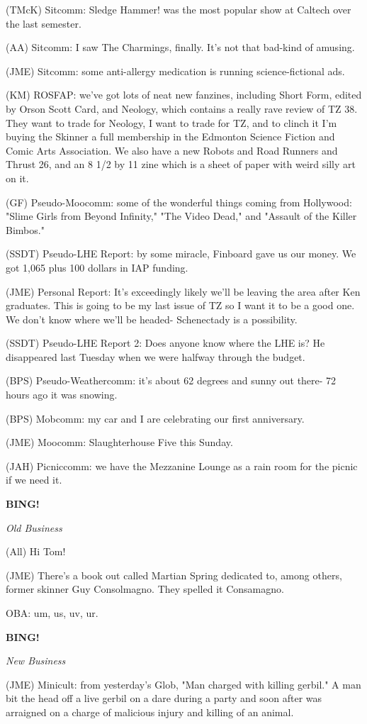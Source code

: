 \documentclass[12pt]{article}
\newcommand{\bing}{{\bf BING!} }
\newcommand{\goto}[1]{\bing \vskip 12pt \centerline{{\em{#1}}}}
\begin{document}
(TMcK) Sitcomm: Sledge Hammer! was the most popular show at Caltech over the last semester.

(AA) Sitcomm: I saw The Charmings, finally. It's not that bad-kind of amusing.

(JME) Sitcomm: some anti-allergy medication is running science-fictional ads.

(KM) ROSFAP: we've got lots of neat new fanzines, including Short Form, edited by Orson Scott Card, and Neology, which contains a really rave review of TZ 38. They want to trade for Neology, I want to trade for TZ, and to clinch it I'm buying the Skinner a full membership in the Edmonton Science Fiction and Comic Arts Association. We also have a new Robots and Road Runners and Thrust 26, and an 8 1/2 by 11 zine which is a sheet of paper with weird silly art on it.

(GF) Pseudo-Moocomm: some of the wonderful things coming from Hollywood: "Slime Girls from Beyond Infinity," "The Video Dead," and "Assault of the Killer Bimbos."

(SSDT) Pseudo-LHE Report: by some miracle, Finboard gave us our money. We got 1,065 plus 100 dollars in IAP funding.

(JME) Personal Report: It's exceedingly likely we'll be leaving the area after Ken graduates. This is going to be my last issue of TZ so I want it to be a good one. We don't know where we'll be headed- Schenectady is a possibility.

(SSDT) Pseudo-LHE Report 2: Does anyone know where the LHE is? He disappeared last Tuesday when we were halfway through the budget.

(BPS) Pseudo-Weathercomm: it's about 62 degrees and sunny out there- 72 hours ago it was snowing.

(BPS) Mobcomm: my car and I are celebrating our first anniversary.

(JME) Moocomm: Slaughterhouse Five this Sunday.

(JAH) Picniccomm: we have the Mezzanine Lounge as a rain room for the picnic if we need it.

\goto{Old Business}

(All) Hi Tom!

(JME) There's a book out called Martian Spring dedicated to, among others, former skinner Guy Consolmagno. They spelled it Consamagno.

OBA: um, us, uv, ur.

\goto{New Business}

(JME) Minicult: from yesterday's Glob, "Man charged with killing gerbil." A man bit the head off a live gerbil on a dare during a party and soon after was arraigned on a charge of malicious injury and killing of an animal.
\end{document}
